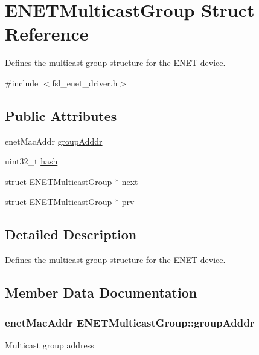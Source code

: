 \hypertarget{structENETMulticastGroup}{}\section{E\+N\+E\+T\+Multicast\+Group Struct Reference}
\label{structENETMulticastGroup}


Defines the multicast group structure for the E\+N\+ET device.  




{\ttfamily \#include $<$fsl\+\_\+enet\+\_\+driver.\+h$>$}

\subsection*{Public Attributes}
\begin{DoxyCompactItemize}
\item 
enet\+Mac\+Addr \hyperlink{structENETMulticastGroup_a9a26316262d9b1bda12abb933be504b5}{group\+Adddr}
\item 
uint32\+\_\+t \hyperlink{structENETMulticastGroup_a9ccae04af5f5dbc73f1d3019b891c1bb}{hash}
\item 
struct \hyperlink{structENETMulticastGroup}{E\+N\+E\+T\+Multicast\+Group} $\ast$ \hyperlink{structENETMulticastGroup_a65d657203ab5d28b05388e0076de2d52}{next}
\item 
struct \hyperlink{structENETMulticastGroup}{E\+N\+E\+T\+Multicast\+Group} $\ast$ \hyperlink{structENETMulticastGroup_ac910b731675e856af7ae052ecc641574}{prv}
\end{DoxyCompactItemize}


\subsection{Detailed Description}
Defines the multicast group structure for the E\+N\+ET device. 

\subsection{Member Data Documentation}
\subsubsection[{\texorpdfstring{group\+Adddr}{groupAdddr}}]{\setlength{\rightskip}{0pt plus 5cm}enet\+Mac\+Addr E\+N\+E\+T\+Multicast\+Group\+::group\+Adddr}\hypertarget{structENETMulticastGroup_a9a26316262d9b1bda12abb933be504b5}{}\label{structENETMulticastGroup_a9a26316262d9b1bda12abb933be504b5}
Multicast group address 

